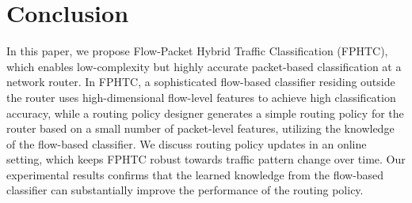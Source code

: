 
\section{Conclusion}
\label{sec:conclusion}
In this paper, we propose Flow-Packet Hybrid Traffic Classification (FPHTC), which enables low-complexity but highly accurate packet-based classification at a network router. In FPHTC, a sophisticated flow-based classifier
residing outside the router uses high-dimensional flow-level features to achieve high classification accuracy, while a routing policy designer generates a simple routing policy for the router based on a small number of packet-level features, utilizing the knowledge of the flow-based classifier. We discuss routing policy updates in an online setting, which keeps FPHTC robust towards traffic pattern change over time. Our experimental results confirms that the learned knowledge from the flow-based classifier can substantially improve the performance of the routing policy.